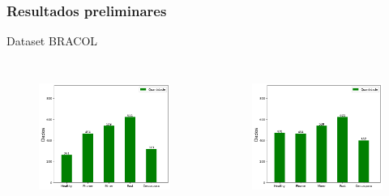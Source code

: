 \documentclass[aspectratio=169]{beamer}
\begin{document}
\begin{frame}
    \frametitle{Resultados preliminares}


    \centering
    Dataset BRACOL

    \begin{columns}



        \begin{figure}
            \centering
            \includegraphics[scale = 0.45]{img/bracol data.png}
            \label{fig:enter-label}
        \end{figure}




        \begin{figure}
            \centering
            \includegraphics[scale = 0.45]{img/bracoldatabalanced.png}
            \label{fig:enter-label}
        \end{figure}


    \end{columns}
\end{frame}
\end{document}
